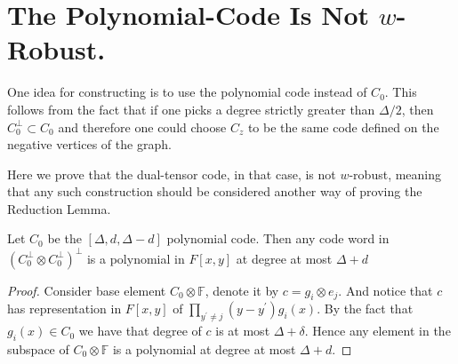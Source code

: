 \section{The Polynomial-Code Is Not $w$-Robust.}
One idea for constructing is to use the polynomial code instead of $C_{0}$. This follows from the fact that if one picks a degree strictly greater than $\Delta/2$, then $C_{0}^{\perp} \subset C_{0}$ and therefore one could choose $C_{z}$ to be the same code defined on the negative vertices of the graph. 

Here we prove that the dual-tensor code, in that case, is not $w$-robust, meaning that any such construction should be considered another way of proving the Reduction Lemma.



\begin{claim}
  \label{claim:poldu}
  Let $C_{0}$ be the $[\Delta,d, \Delta-d]$ polynomial code. Then any code word in $\left( C_{0}^{\perp} \otimes C_{0}^{\perp} \right)^{\perp}$ is a polynomial in $F[x,y]$ at degree at most $\Delta + d$
\end{claim}
\begin{proof}
Consider base element $ C_{0} \otimes \mathbb{F} $, denote it by $c = g_{i} \otimes e_{j}$. And notice that $c$ has representation in $F[x,y]$ of $\prod_{y^{\prime} \neq j}{\left( y - y^{\prime} \right) }g_{i}\left( x \right)$. By the fact that $g_{i}\left( x \right) \in C_{0} $ we have that degree of $c$ is at most $\Delta + \delta$. Hence any element in the subspace of $C_{0} \otimes \mathbb{F}$ is a polynomial at degree at most $\Delta + d$.   
\end{proof}

